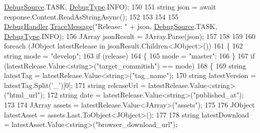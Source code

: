 \begin{DoxyCode}
      \mbox{\hyperlink{namespace_little_weeb_library_1_1_handlers_a2a6ca0775121c9c503d58aa254d292be}{DebugSource}}.TASK, \mbox{\hyperlink{namespace_little_weeb_library_1_1_handlers_ab66019ed40462876ec4e61bb3ccb0a62}{DebugType}}.INFO);
150 
151                     \textcolor{keywordtype}{string} json = await response.Content.ReadAsStringAsync();
152 
153 
154 
155                     \mbox{\hyperlink{class_little_weeb_library_1_1_handlers_1_1_version_handler_a9d4e181ca6b1efff96f530dd7981d6e3}{DebugHandler}}.\mbox{\hyperlink{interface_little_weeb_library_1_1_handlers_1_1_i_debug_handler_a2e405bc3492e683cd3702fae125221bc}{TraceMessage}}(\textcolor{stringliteral}{"Release: "} + json, 
      \mbox{\hyperlink{namespace_little_weeb_library_1_1_handlers_a2a6ca0775121c9c503d58aa254d292be}{DebugSource}}.TASK, \mbox{\hyperlink{namespace_little_weeb_library_1_1_handlers_ab66019ed40462876ec4e61bb3ccb0a62}{DebugType}}.INFO);
156                     JArray jsonResult = JArray.Parse(json);
157 
158 
159 
160                     \textcolor{keywordflow}{foreach} (JObject latestRelease \textcolor{keywordflow}{in} jsonResult.Children<JObject>())
161                     \{
162                         \textcolor{keywordtype}{string} mode = \textcolor{stringliteral}{"develop"};
163                         \textcolor{keywordflow}{if} (release)
164                         \{
165                             mode = \textcolor{stringliteral}{"master"};
166                         \}
167                         \textcolor{keywordflow}{if} (latestRelease.Value<\textcolor{keywordtype}{string}>(\textcolor{stringliteral}{"target\_commitish"}) == mode)
168                         \{
169                             \textcolor{keywordtype}{string} latestTag = latestRelease.Value<\textcolor{keywordtype}{string}>(\textcolor{stringliteral}{"tag\_name"});
170                             \textcolor{keywordtype}{string} latestVersion = latestTag.Split(\textcolor{charliteral}{'\_'})[0];
171                             \textcolor{keywordtype}{string} releaseUrl = latestRelease.Value<\textcolor{keywordtype}{string}>(\textcolor{stringliteral}{"html\_url"});
172                             \textcolor{keywordtype}{string} date = latestRelease.Value<\textcolor{keywordtype}{string}>(\textcolor{stringliteral}{"published\_at"});
173 
174                             JArray assets = latestRelease.Value<JArray>(\textcolor{stringliteral}{"assets"});
175 
176                             JObject latestAsset = assets.Last.ToObject<JObject>();
177 
178                             \textcolor{keywordtype}{string} latestDownload = latestAsset.Value<\textcolor{keywordtype}{string}>(\textcolor{stringliteral}{"browser\_download\_url"});

\end{DoxyCode}
